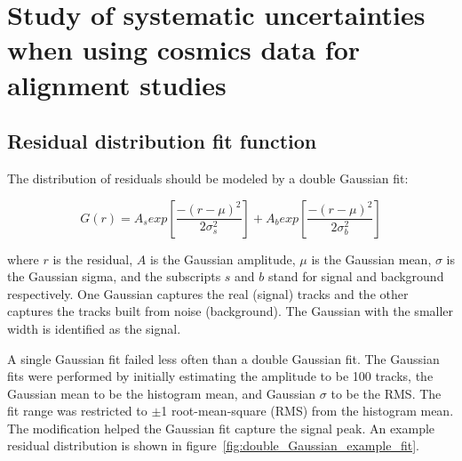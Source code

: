 

\chapter[Analysis systematics]{Study of systematic uncertainties when using cosmics data for alignment studies}
\label{appendix:systematics}


\section{Residual distribution fit function}
\label{appendix:systematics_res_fit_fcn}


The distribution of residuals should be modeled by a double Gaussian fit\cite{lefebvre_thesis}:

\begin{equation}
\label{eqn:doub_gaus}
G(r) = A_{s}exp\left[ \frac{-(r-\mu)^{2}}{2\sigma_s^{2}} \right] + A_{b}exp\left[ \frac{-(r-\mu)^{2}}{2\sigma_b^{2}} \right]
\end{equation}

where $r$ is the residual, $A$ is the Gaussian amplitude, $\mu$ is the Gaussian mean, $\sigma$ is the Gaussian sigma, and the subscripts $s$ and $b$ stand for signal and background respectively. One Gaussian captures the real (signal) tracks and the other captures the tracks built from noise (background). The Gaussian with the smaller width is identified as the signal. 

A single Gaussian fit failed less often than a double Gaussian fit. The Gaussian fits were performed by initially estimating the amplitude to be 100 tracks, the Gaussian mean to be the histogram mean, and Gaussian $\sigma$ to be the RMS. The fit range was restricted to $\pm$1 root-mean-square (RMS) from the histogram mean. The modification helped the Gaussian fit capture the signal peak. An example residual distribution is shown in figure~\ref{fig:double_Gaussian_example_fit}. 

